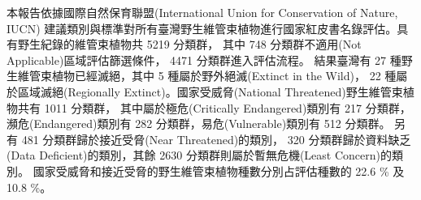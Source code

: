 \noindent 本報告依據國際自然保育聯盟(International Union for Conservation of Nature, IUCN)
建議類別與標準對所有臺灣野生維管束植物進行國家紅皮書名錄評估。具有野生紀錄的維管束植物共 5219 分類群，
其中 748 分類群不適用(Not Applicable)區域評估篩選條件， 4471 分類群進入評估流程。
結果臺灣有 27 種野生維管束植物已經滅絕，其中 5 種屬於野外絕滅(Extinct in the Wild)，
22 種屬於區域滅絕(Regionally Extinct)。國家受威脅(National Threatened)野生維管束植物共有 1011 分類群，
其中屬於極危(Critically Endangered)類別有 217 分類群，
瀕危(Endangered)類別有 282 分類群，易危(Vulnerable)類別有 512 分類群。
另有 481 分類群歸於接近受脅(Near Threatened)的類別，
320 分類群歸於資料缺乏(Data Deficient)的類別，其餘 2630 分類群則屬於暫無危機(Least Concern)的類別。
國家受威脅和接近受脅的野生維管束植物種數分別占評估種數的 22.6 \% 及 10.8 \%。 
